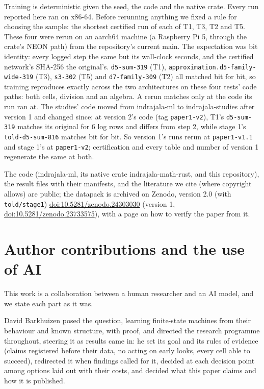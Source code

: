 \documentclass[11pt]{article}
\begin{document}
Training is deterministic given the seed, the code and the native crate. Every run reported here ran
on x86-64. Before rerunning anything we fixed a rule for choosing the sample: the shortest certified
run of each of T1, T3, T2 and T5. These four were rerun on an aarch64 machine (a Raspberry Pi 5,
through the crate's NEON path) from the repository's current main. The expectation was bit identity:
every logged step the same but its wall-clock seconds, and the certified network's SHA-256 the
original's. \texttt{d5-sum-319} (T1), \texttt{approximation.d5-family-wide-319} (T3),
\texttt{s3-302} (T5) and \texttt{d7-family-309} (T2) all matched bit for bit, so training
reproduces exactly across the two architectures on these four tests' code paths: both cells,
division and an algebra. A rerun matches only at the code its run ran at. The studies' code moved from
indrajala-ml to indrajala-studies after version 1 and changed since: at version 2's code (tag
\texttt{paper1-v2}), T1's \texttt{d5-sum-319} matches its original for 6 log rows and differs from
step 2, while stage 1's \texttt{told-d5-sum-816} matches bit for bit. So version 1's runs rerun at
\texttt{paper1-v1.1} and stage 1's at \texttt{paper1-v2}; certification and every table and number
of version 1 regenerate the same at both.

The code (indrajala-ml, its native crate indrajala-math-rust, and this repository), the result
files with their manifests, and the literature we cite (where copyright allows) are public; the
datapack is archived on Zenodo, version 2.0 (with \texttt{told/stage1}) \href{https://doi.org/10.5281/zenodo.24303030}{doi:10.5281/zenodo.24303030}
(version 1, \href{https://doi.org/10.5281/zenodo.23733575}{doi:10.5281/zenodo.23733575}), with
a page on how to verify the paper from it.

\section*{Author contributions and the use of AI}

This work is a collaboration between a human researcher and an AI model, and we state each part as
it was.

David Barkhuizen posed the question, learning finite-state machines from their behaviour and known
structure, with proof, and directed the research programme throughout, steering it as results came
in: he set its goal and its rules of evidence (claims registered before their data, no acting on
early looks, every cell able to succeed), redirected it when findings called for it, decided at each
decision point among options laid out with their costs, and decided what this paper claims and how
it is published.
\end{document}

